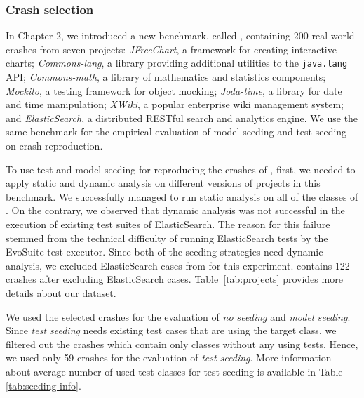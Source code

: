 \subsubsection{Crash selection}
\label{sec:setup:setup:selection}
In Chapter 2, we introduced a new benchmark, called \jcrashpack, containing 200 real-world crashes from seven projects: 
\textit{JFreeChart}, a framework for creating interactive charts; 
\textit{Commons-lang}, a library providing additional utilities to the \texttt{java.lang} API;
\textit{Commons-math}, a library of mathematics and statistics components; 
\textit{Mockito}, a testing framework for object mocking; 
\textit{Joda-time}, a library for date and time manipulation; 
\textit{XWiki}, a popular enterprise wiki management system; 
and \textit{ElasticSearch}, a distributed RESTful search and analytics engine.
We use the same benchmark for the empirical evaluation of model-seeding and test-seeding on crash reproduction.


To use test and model seeding for reproducing the crashes of \jcrashpack, first, we needed to apply static and dynamic analysis on different versions of projects in this benchmark. We successfully managed to run static analysis on all of the classes of \jcrashpack.
On the contrary, we observed that dynamic analysis was not successful in the execution of existing test suites of ElasticSearch. The reason for this failure stemmed from the technical difficulty of running ElasticSearch tests by the EvoSuite test executor. 
Since both of the seeding strategies need dynamic analysis, we excluded ElasticSearch cases from \jcrashpack for this experiment. 
\jcrashpack contains 122 crashes after excluding ElasticSearch cases. Table~\ref{tab:projects} provides more details about our dataset.

We used the selected crashes for the evaluation of \emph{no seeding} and \emph{model seeding}. Since \emph{test seeding} needs existing test cases that are using the target class, we filtered out the crashes which contain only classes without any using tests. Hence, we used only 59 crashes for the evaluation of \emph{test seeding}. More information about average number of used test classes for test seeding is available in Table \ref{tab:seeding-info}.



